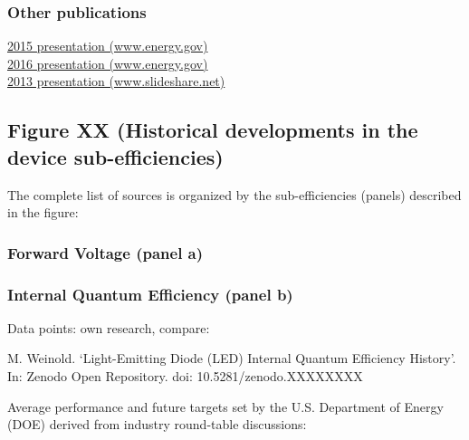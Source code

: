 \documentclass[10pt]{article}
\begin{document}
\subsubsection{Other publications}

\href{https://web.archive.org/web/20170801160530/https://www.energy.gov/sites/prod/files/2015/02/f19/craford_innovation_sanfrancisco2015.pdf}{2015 presentation (www.energy.gov)} \\
\href{https://web.archive.org/web/20170715230721/https://www.energy.gov/sites/prod/files/2016/02/f29/sun_china_raleigh2016.pdf}{2016 presentation (www.energy.gov)} \\
\href{http://web.archive.org/web/20160425025936/https://www.slideshare.net/Yole_Developpement/yole-led-packagingjanuary2013reportsample}{2013 presentation (www.slideshare.net)}

\subsection{Figure XX (Historical developments in the device sub-efficiencies)}

The complete list of sources is organized by the sub-efficiencies (panels) described in the figure:

\subsubsection{Forward Voltage (panel a)}

\cite{nichia2001data}\cite{lumi2002data}\cite{gen2005data}\cite{candlepwr2005data}\cite{lumi2006data}\cite{lumi2007data}\cite{nichia2008data}\cite{lumi2008data}\cite{osram2008data}\cite{jeong2011high}\cite{osram2012data}\cite{osram2013data}\cite{osram2014data}\cite{lumi2016data_1}\cite{lumi2016data_2}\cite{epistar2017data}\cite{osram2017data_1}\cite{osram2017data_2}\cite{samsung2017data}\cite{samsung2018data}\cite{osram2018data}\cite{epistar2018data}\cite{lumi2019data}

\subsubsection{Internal Quantum Efficiency (panel b)}

Data points: own research, compare:

M. Weinold. ‘Light-Emitting Diode (LED) Internal Quantum Efficiency History’.
In: Zenodo Open Repository. doi: 10.5281/zenodo.XXXXXXXX

Average performance and future targets set by the U.S. Department of Energy (DOE) derived from industry round-table discussions:
\end{document}
